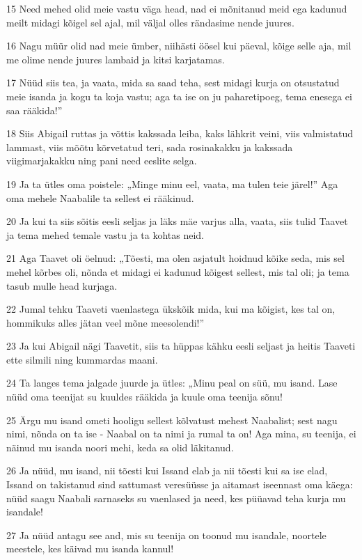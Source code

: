 \par 15 Need mehed olid meie vastu väga head, nad ei mõnitanud meid ega kadunud meilt midagi kõigel sel ajal, mil väljal olles rändasime nende juures.
\par 16 Nagu müür olid nad meie ümber, niihästi öösel kui päeval, kõige selle aja, mil me olime nende juures lambaid ja kitsi karjatamas.
\par 17 Nüüd siis tea, ja vaata, mida sa saad teha, sest midagi kurja on otsustatud meie isanda ja kogu ta koja vastu; aga ta ise on ju paharetipoeg, tema enesega ei saa rääkida!”
\par 18 Siis Abigail ruttas ja võttis kakssada leiba, kaks lähkrit veini, viis valmistatud lammast, viis mõõtu kõrvetatud teri, sada rosinakakku ja kakssada viigimarjakakku ning pani need eeslite selga.
\par 19 Ja ta ütles oma poistele: „Minge minu eel, vaata, ma tulen teie järel!” Aga oma mehele Naabalile ta sellest ei rääkinud.
\par 20 Ja kui ta siis sõitis eesli seljas ja läks mäe varjus alla, vaata, siis tulid Taavet ja tema mehed temale vastu ja ta kohtas neid.
\par 21 Aga Taavet oli öelnud: „Tõesti, ma olen asjatult hoidnud kõike seda, mis sel mehel kõrbes oli, nõnda et midagi ei kadunud kõigest sellest, mis tal oli; ja tema tasub mulle head kurjaga.
\par 22 Jumal tehku Taaveti vaenlastega ükskõik mida, kui ma kõigist, kes tal on, hommikuks alles jätan veel mõne meesolendi!”
\par 23 Ja kui Abigail nägi Taavetit, siis ta hüppas kähku eesli seljast ja heitis Taaveti ette silmili ning kummardas maani.
\par 24 Ta langes tema jalgade juurde ja ütles: „Minu peal on süü, mu isand. Lase nüüd oma teenijat su kuuldes rääkida ja kuule oma teenija sõnu!
\par 25 Ärgu mu isand ometi hooligu sellest kõlvatust mehest Naabalist; sest nagu nimi, nõnda on ta ise - Naabal on ta nimi ja rumal ta on! Aga mina, su teenija, ei näinud mu isanda noori mehi, keda sa olid läkitanud.
\par 26 Ja nüüd, mu isand, nii tõesti kui Issand elab ja nii tõesti kui sa ise elad, Issand on takistanud sind sattumast veresüüsse ja aitamast iseennast oma käega: nüüd saagu Naabali sarnaseks su vaenlased ja need, kes püüavad teha kurja mu isandale!
\par 27 Ja nüüd antagu see and, mis su teenija on toonud mu isandale, noortele meestele, kes käivad mu isanda kannul!
